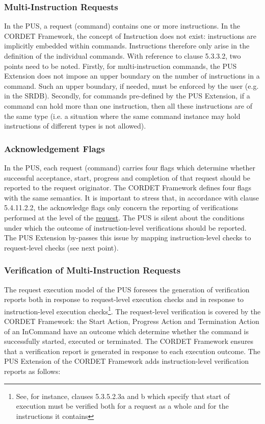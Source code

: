 \documentclass{pnp_article}
\begin{document}
\subsubsection{Multi-Instruction Requests}
In the PUS, a request (command) contains one or more instructions. In the CORDET Framework, the concept of Instruction does not exist: instructions are implicitly embedded within commands. Instructions therefore only arise in the definition of the individual commands. With reference to clause 5.3.3.2, two points need to be noted. Firstly, for multi-instruction commands, the PUS Extension does not impose an upper boundary on the number of instructions in a command. Such an upper boundary, if needed, must be enforced by the user (e.g. in the SRDB). Secondly, for commands pre-defined by the PUS Extension, if a command can hold more than one instruction, then all these instructions are of the same type (i.e. a situation where the same command instance may hold instructions of different types is not allowed). 

\subsubsection{Acknowledgement Flags} In the PUS, each request (command) carries four flags which determine whether successful acceptance, start, progress and completion of that request should be reported to the request originator. The CORDET Framework defines four flags with the same semantics. It is important to stress that, in accordance with clause 5.4.11.2.2, the acknowledge flags only concern the reporting of verifications performed at the level of the \underline{request}. The PUS is silent about the conditions under which the outcome of instruction-level verifications should be reported. The PUS Extension by-passes this issue by mapping instruction-level checks to request-level checks (see next point). 


\subsubsection{Verification of Multi-Instruction Requests}
The request execution model of the PUS foresees the generation of verification reports both in response to request-level execution checks and in response to instruction-level execution checks\footnote{See, for instance, clauses 5.3.5.2.3a and b which specify that start of execution must be verified both for a request as a whole and for the instructions it contains}. The request-level verification is covered by the CORDET Framework: the Start Action, Progress Action and Termination Action of an InCommand have an outcome which determine whether the command is successfully started, executed or terminated. The CORDET Framework ensures that a verification report is generated in response to each execution outcome. The PUS Extension of the CORDET Framework adds instruction-level verification reports as follows:
\end{document}

